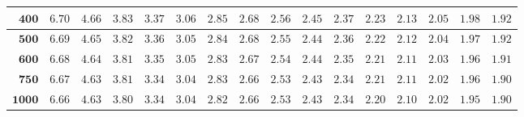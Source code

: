 \begin{alternateColorTable}
\begin{longtable}{|r|r|r|r|r|r|r|r|r|r|r|r|r|r|r|r|}
    \(\mathbf{400}\) & \(6.70\) & \(4.66\) & \(3.83\) & \(3.37\) & \(3.06\) & \(2.85\) & \(2.68\) & \(2.56\) & \(2.45\) & \(2.37\) & \(2.23\) & \(2.13\) & \(2.05\) & \(1.98\) & \(1.92\) \\ \hline 
    \(\mathbf{500}\) & \(6.69\) & \(4.65\) & \(3.82\) & \(3.36\) & \(3.05\) & \(2.84\) & \(2.68\) & \(2.55\) & \(2.44\) & \(2.36\) & \(2.22\) & \(2.12\) & \(2.04\) & \(1.97\) & \(1.92\) \\ \hline 
    \(\mathbf{600}\) & \(6.68\) & \(4.64\) & \(3.81\) & \(3.35\) & \(3.05\) & \(2.83\) & \(2.67\) & \(2.54\) & \(2.44\) & \(2.35\) & \(2.21\) & \(2.11\) & \(2.03\) & \(1.96\) & \(1.91\) \\ \hline 
    \(\mathbf{750}\) & \(6.67\) & \(4.63\) & \(3.81\) & \(3.34\) & \(3.04\) & \(2.83\) & \(2.66\) & \(2.53\) & \(2.43\) & \(2.34\) & \(2.21\) & \(2.11\) & \(2.02\) & \(1.96\) & \(1.90\) \\ \hline 
    \(\mathbf{1000}\) & \(6.66\) & \(4.63\) & \(3.80\) & \(3.34\) & \(3.04\) & \(2.82\) & \(2.66\) & \(2.53\) & \(2.43\) & \(2.34\) & \(2.20\) & \(2.10\) & \(2.02\) & \(1.95\) & \(1.90\) \\ \hline 


\end{longtable}
\end{alternateColorTable}
\changefontsizes{11pt}

\setlength{\LTleft}{0in} %
\setlength{\LTright}{0in} %


\newpage

